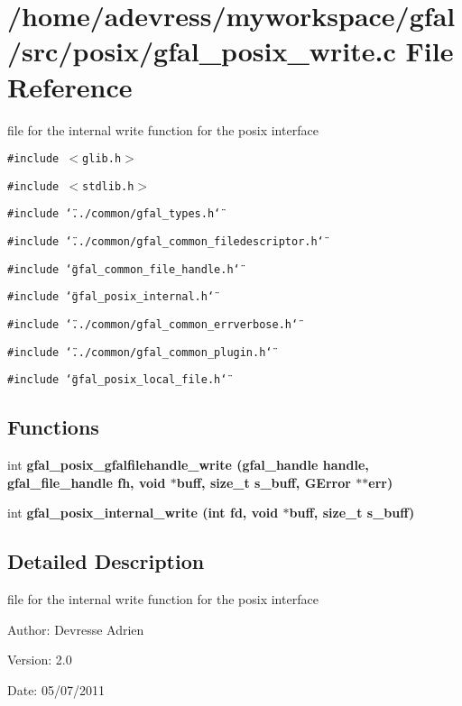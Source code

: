 \section{/home/adevress/myworkspace/gfal/src/posix/gfal\_\-posix\_\-write.c File Reference}
\label{gfal__posix__write_8c}
file for the internal write function for the posix interface 

{\tt \#include $<$glib.h$>$}\par
{\tt \#include $<$stdlib.h$>$}\par
{\tt \#include \char`\"{}../common/gfal\_\-types.h\char`\"{}}\par
{\tt \#include \char`\"{}../common/gfal\_\-common\_\-filedescriptor.h\char`\"{}}\par
{\tt \#include \char`\"{}gfal\_\-common\_\-file\_\-handle.h\char`\"{}}\par
{\tt \#include \char`\"{}gfal\_\-posix\_\-internal.h\char`\"{}}\par
{\tt \#include \char`\"{}../common/gfal\_\-common\_\-errverbose.h\char`\"{}}\par
{\tt \#include \char`\"{}../common/gfal\_\-common\_\-plugin.h\char`\"{}}\par
{\tt \#include \char`\"{}gfal\_\-posix\_\-local\_\-file.h\char`\"{}}\par
\subsection*{Functions}
\begin{CompactItemize}
\item 
int \bf{gfal\_\-posix\_\-gfalfilehandle\_\-write} (gfal\_\-handle handle, gfal\_\-file\_\-handle fh, void $\ast$buff, size\_\-t s\_\-buff, GError $\ast$$\ast$err)
\item 
int \bf{gfal\_\-posix\_\-internal\_\-write} (int fd, void $\ast$buff, size\_\-t s\_\-buff)
\end{CompactItemize}


\subsection{Detailed Description}
file for the internal write function for the posix interface 

\begin{Desc}
\item[Author:]Devresse Adrien \end{Desc}
\begin{Desc}
\item[Version:]2.0 \end{Desc}
\begin{Desc}
\item[Date:]05/07/2011 \end{Desc}


